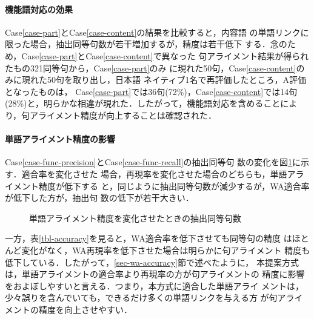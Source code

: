 \label{case-func-recall}


\paragraph{機能語対応の効果}

Case\ref{case-part}とCase\ref{case-content}の結果を比較すると，内容語
の単語リンクに限った場合，抽出同等句数が若干増加するが，精度は若干低下
する．念のため，Case\ref{case-part}とCase\ref{case-content}で異なった
句アライメント結果が得られたもの321同等句から，Case\ref{case-part}のみ
に現れた50句，Case\ref{case-content}のみに現れた50句を取り出し，日本語
ネイティブ1名で再評価したところ，A評価となったものは，
Case\ref{case-part}では36句(72\%)，Case\ref{case-content}では14句
(28\%)と，明らかな相違が現れた．したがって，機能語対応を含めることによ
り，句アライメント精度が向上することは確認された．

\paragraph{単語アライメント精度の影響}

Case\ref{case-func-precision}とCase\ref{case-func-recall}の抽出同等句
数の変化を図\ref{fig-variable-word-accuracy}に示す．適合率を変化させた
場合，再現率を変化させた場合のどちらも，単語アライメント精度が低下する
と，同じように抽出同等句数が減少するが，WA適合率が低下した方が，抽出句
数の低下が若干大きい．

\begin{figure}
\begin{center}
\caption{単語アライメント精度を変化させたときの抽出同等句数}
\label{fig-variable-word-accuracy}
\end{center}
\end{figure}

一方，表\ref{tbl-accuracy}を見ると，WA適合率を低下させても同等句の精度
はほとんど変化がなく，WA再現率を低下させた場合は明らかに句アライメント
精度も低下している．したがって，\ref{sec-wa-accuracy}節で述べたように，
本提案方式は，単語アライメントの適合率より再現率の方が句アライメントの
精度に影響をおよぼしやすいと言える．つまり，本方式に適合した単語アライ
メントは，少々誤りを含んでいても，できるだけ多くの単語リンクを与える方
が句アライメントの精度を向上させやすい．

